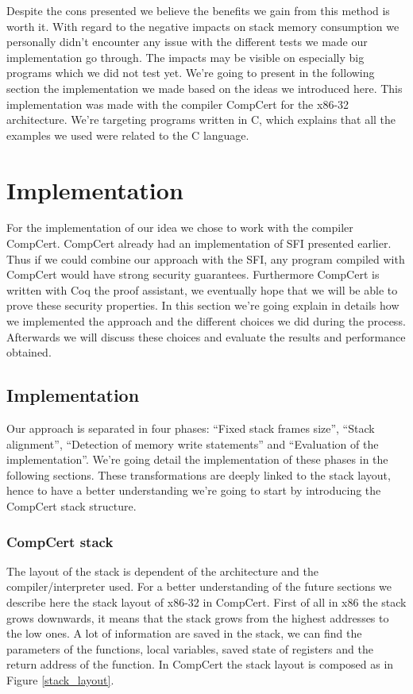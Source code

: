 \documentclass[11pt]{sdm}
\begin{document}
Despite the cons presented we believe the benefits we gain from this method is worth it. With regard to the negative impacts on stack memory consumption we personally didn't encounter any issue with the different tests we made our implementation go through. The impacts may be visible on especially big programs which we did not test yet.
We're going to present in the following section the implementation we made based on the ideas we introduced here. This implementation was made with the compiler CompCert for the x86-32 architecture. We're targeting programs written in C, which explains that all the examples we used were related to the C language.


\label{sec:section name}

\section{Implementation}
\label{sec:Implementation and analysis}

For the implementation of our idea we chose to work with the compiler CompCert. CompCert already had an implementation of SFI presented earlier. Thus if we could combine our approach with the SFI, any program compiled with CompCert would have strong security guarantees. Furthermore CompCert is written with Coq the proof assistant, we eventually hope that we will be able to prove these security properties. In this section we're going explain in details how we implemented the approach and the different choices we did during the process. Afterwards we will discuss these choices and evaluate the results and performance obtained.

\subsection{Implementation}
\label{sub:Implementation}
	Our approach is separated in four phases: ``Fixed stack frames size'', ``Stack alignment'', ``Detection of memory write statements'' and ``Evaluation of the implementation''. We're going detail the implementation of these phases in the following sections. These transformations are deeply linked to the stack layout, hence to have a better understanding we're going to start by introducing the CompCert stack structure.

\subsubsection{CompCert stack}
\label{ssub:CompCert stack}
	The layout of the stack is dependent of the architecture and the compiler/interpreter used. For a better understanding of the future sections we describe here the stack layout of x86-32 in CompCert.
First of all in x86 the stack grows downwards, it means that the stack grows from the highest addresses to the low ones.
A lot of information are saved in the stack, we can find the parameters of the functions, local variables, saved state of registers and the return address of the function.
In CompCert the stack layout is composed as in Figure \ref{stack_layout}.
\end{document}
